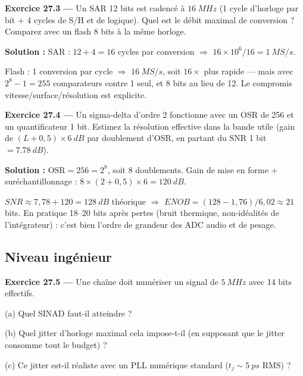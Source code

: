 \documentclass[12pt,a4paper,twoside]{book}
\begin{document}
\textbf{Exercice 27.3 ---} Un SAR 12 bits est cadencé à $\SI{16}{MHz}$ (1 cycle d'horloge par bit + 4 cycles de S/H et de logique). Quel est le débit maximal de conversion ? Comparez avec un flash 8 bits à la même horloge.

\begin{pratique}
\textbf{Solution :} SAR : $12 + 4 = 16$ cycles par conversion $\Rightarrow$ $16\times10^6/16 = \SI{1}{MS/s}$.

Flash : 1 conversion par cycle $\Rightarrow$ $\SI{16}{MS/s}$, soit $16\times$ plus rapide --- mais avec $2^8-1 = 255$ comparateurs contre 1 seul, et 8 bits au lieu de 12. Le compromis vitesse/surface/résolution est explicite.
\end{pratique}

\textbf{Exercice 27.4 ---} Un sigma-delta d'ordre 2 fonctionne avec un OSR de 256 et un quantificateur 1 bit. Estimez la résolution effective dans la bande utile (gain de $(L+0{,}5)\times\SI{6}{dB}$ par doublement d'OSR, en partant du SNR 1 bit $= \SI{7.78}{dB}$).

\begin{pratique}
\textbf{Solution :} $\text{OSR} = 256 = 2^8$, soit 8 doublements. Gain de mise en forme + suréchantillonnage : $8 \times (2+0{,}5) \times 6 = \SI{120}{dB}$.

$SNR \approx 7{,}78 + 120 = \SI{128}{dB}$ théorique $\Rightarrow$ $ENOB = (128-1{,}76)/6{,}02 \approx 21$ bits. En pratique 18--20 bits après pertes (bruit thermique, non-idéalités de l'intégrateur) : c'est bien l'ordre de grandeur des ADC audio et de pesage.
\end{pratique}

\subsection*{Niveau ingénieur}

\textbf{Exercice 27.5 ---} Une chaîne doit numériser un signal de $\SI{5}{MHz}$ avec 14 bits effectifs.

(a) Quel SINAD faut-il atteindre ?

(b) Quel jitter d'horloge maximal cela impose-t-il (en supposant que le jitter consomme tout le budget) ?

(c) Ce jitter est-il réaliste avec un PLL numérique standard ($t_j \sim \SI{5}{ps}$ RMS) ?
\end{document}
